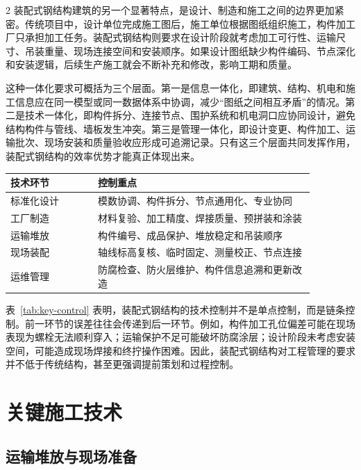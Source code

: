 \documentclass[UTF8,a4paper,10.5pt]{ctexart}
\begin{document}
\begin{multicols}{2}
装配式钢结构建筑的另一个显著特点，是设计、制造和施工之间的边界更加紧密。传统项目中，设计单位完成施工图后，施工单位根据图纸组织施工，构件加工厂只承担加工任务。装配式钢结构则要求在设计阶段就考虑加工可行性、运输尺寸、吊装重量、现场连接空间和安装顺序。如果设计图纸缺少构件编码、节点深化和安装逻辑，后续生产施工就会不断补充和修改，影响工期和质量。

这种一体化要求可概括为三个层面。第一是信息一体化，即建筑、结构、机电和施工信息应在同一模型或同一数据体系中协调，减少“图纸之间相互矛盾”的情况。第二是技术一体化，即构件拆分、连接节点、围护系统和机电洞口应协同设计，避免结构构件与管线、墙板发生冲突。第三是管理一体化，即设计变更、构件加工、运输批次、现场安装和质量验收应形成可追溯记录。只有这三个层面共同发挥作用，装配式钢结构的效率优势才能真正体现出来。

\begin{center}
\label{tab:key-control}
\begin{tabular}{p{0.25\linewidth}p{0.62\linewidth}}
\toprule
技术环节 & 控制重点 \\
\midrule
标准化设计 & 模数协调、构件拆分、节点通用化、专业协同 \\
工厂制造 & 材料复验、加工精度、焊接质量、预拼装和涂装 \\
运输堆放 & 构件编号、成品保护、堆放稳定和吊装顺序 \\
现场装配 & 轴线标高复核、临时固定、测量校正、节点连接 \\
运维管理 & 防腐检查、防火层维护、构件信息追溯和更新改造 \\
\bottomrule
\end{tabular}
\end{center}

表~\ref{tab:key-control} 表明，装配式钢结构的技术控制并不是单点控制，而是链条控制。前一环节的误差往往会传递到后一环节。例如，构件加工孔位偏差可能在现场表现为螺栓无法顺利穿入；运输保护不足可能破坏防腐涂层；设计阶段未考虑安装空间，可能造成现场焊接和终拧操作困难。因此，装配式钢结构对工程管理的要求并不低于传统结构，甚至更强调提前策划和过程控制。

\section{关键施工技术}

\subsection{运输堆放与现场准备}


\end{multicols}
\end{document}
